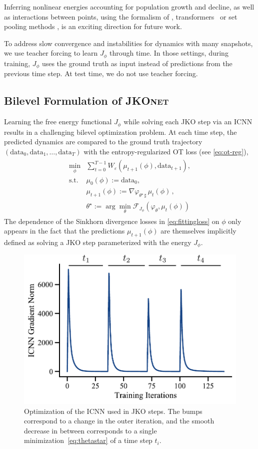 Inferring nonlinear energies accounting for population growth and decline, as well as interactions between points, using the formalism of \citep{de2019stochastic}, transformers~\citep{vaswani2017attention} or set pooling methods \citep{edwards2016towards, zaheer2017deep}, is an exciting direction for future work.

To address slow convergence and instabilities for dynamics with many snapshots, we use teacher forcing \citep{williams1989learning} to learn $J_\phi$ through time. In those settings, during training, $J_\phi$ uses the ground truth as input instead of predictions from the previous time step. At test time, we do not use teacher forcing.

\subsection{Bilevel Formulation of \textsc{JKOnet}}
Learning the free energy functional $J_\phi$ while solving each \acrshort{JKO} step via an ICNN results in a challenging bilevel optimization problem.
At each time step, the predicted dynamics are compared to the ground truth trajectory $(\mathrm{data}_0, \mathrm{data}_1, \dots, \mathrm{data}_T)$ with the entropy-regularized OT loss (see \ref{eq:ot-reg}),
\begin{align} \label{eq:fittingloss}
\begin{split}
    \min_\phi & \sum_{t=0}^{T-1} W_\varepsilon(\mu_{t+1}(\phi), \mathrm{data}_{t+1}), \\
    \text{s.t. } & \mu_{0}(\phi) := \mathrm{data}_0, \\
      & \mu_{t+1}(\phi) := \nabla \varphi_{\theta^\star\, \sharp}\, \mu_{t}(\phi)\,, \\
      & \theta^\star:=\arg \min_{\theta} \mathcal{F}_{J_{\phi}}(\varphi_{\theta},\mu_t(\phi))
\end{split}
\end{align}
The dependence of the Sinkhorn divergence losses in \eqref{eq:fittingloss} on $\phi$ only appears in the fact that the predictions $\mu_{t+1}(\phi)$ are themselves implicitly defined as solving a \acrshort{JKO} step parameterized with the energy $J_\phi$. 

\begin{figure}[t]
    \centering
    \includegraphics[width=.6\textwidth]{figures/fig_optimization_icnn.pdf}
    \caption{Optimization of the ICNN used in \acrshort{JKO} steps. The bumps correspond to a change in the outer iteration, and the smooth decrease in between corresponds to a single minimization~\eqref{eq:thetastar} of a time step $t_i$.}
    \label{fig:training_icnn}
\end{figure}

